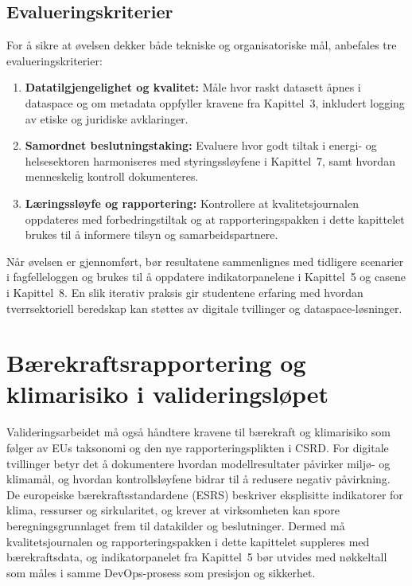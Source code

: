 \subsection{Evalueringskriterier}
For å sikre at øvelsen dekker både tekniske og organisatoriske mål, anbefales tre evalueringskriterier:
\begin{enumerate}
    \item \textbf{Datatilgjengelighet og kvalitet:} Måle hvor raskt datasett åpnes i dataspace og om metadata oppfyller kravene fra Kapittel~3, inkludert logging av etiske og juridiske avklaringer.
    \item \textbf{Samordnet beslutningstaking:} Evaluere hvor godt tiltak i energi- og helsesektoren harmoniseres med styringssløyfene i Kapittel~7, samt hvordan menneskelig kontroll dokumenteres.
    \item \textbf{Læringssløyfe og rapportering:} Kontrollere at kvalitetsjournalen oppdateres med forbedringstiltak og at rapporteringspakken i dette kapittelet brukes til å informere tilsyn og samarbeidspartnere.
\end{enumerate}

Når øvelsen er gjennomført, bør resultatene sammenlignes med tidligere scenarier i fagfelleloggen og brukes til å oppdatere indikatorpanelene i Kapittel~5 og casene i Kapittel~8. En slik iterativ praksis gir studentene erfaring med hvordan tverrsektoriell beredskap kan støttes av digitale tvillinger og dataspace-løsninger.

\section{Bærekraftsrapportering og klimarisiko i valideringsløpet}
Valideringsarbeidet må også håndtere kravene til bærekraft og klimarisiko som følger av EUs taksonomi og den nye rapporteringsplikten i CSRD.\citep{eu2020taxonomy,eu2022csrd} For digitale tvillinger betyr det å dokumentere hvordan modellresultater påvirker miljø- og klimamål, og hvordan kontrollsløyfene bidrar til å redusere negativ påvirkning. De europeiske bærekraftsstandardene (ESRS) beskriver eksplisitte indikatorer for klima, ressurser og sirkularitet, og krever at virksomheten kan spore beregningsgrunnlaget frem til datakilder og beslutninger.\citep{efrag2023esrs} Dermed må kvalitetsjournalen og rapporteringspakken i dette kapittelet suppleres med bærekraftsdata, og indikatorpanelet fra Kapittel~5 bør utvides med nøkkeltall som måles i samme DevOps-prosess som presisjon og sikkerhet.

